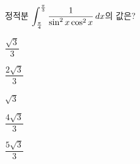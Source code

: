 정적분 $\displaystyle\int_{\frac{\pi}{4}}^{\frac{\pi}{3}}\dfrac{1}{\sin^2 x\cos^2 x}\mkern3mu dx$의 값은?
\begin{choices32}{\rule[-3ex]{0pt}{8ex}$\dfrac{\sqrt{3}}{3}$}{\rule[-3ex]{0pt}{8ex}$\dfrac{2\sqrt{3}}{3}$}{\rule[-3ex]{0pt}{8ex}$\sqrt{3}$}{\rule[-3ex]{0pt}{8ex}$\dfrac{4\sqrt{3}}{3}$}{\rule[-3ex]{0pt}{8ex}$\dfrac{5\sqrt{3}}{3}$}\end{choices32}
